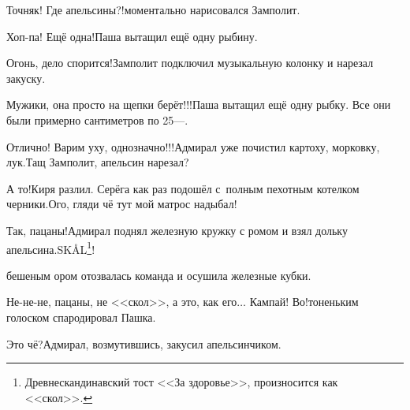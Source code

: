 \diagdash Точняк! Где апельсины?!\mdash моментально нарисовался Замполит.

\diagdash Хоп-па! Ещё одна!\mdash Паша вытащил ещё одну рыбину.

\diagdash Огонь, дело спорится!\mdash Замполит подключил музыкальную колонку и нарезал закуску.

\diagdash Мужики, она просто на щепки берёт!!!\mdash Паша вытащил ещё одну рыбку. Все они были примерно сантиметров по 25\thinspace\nobreakdash---.

\diagdash Отлично! Варим уху, однозначно!!!\mdash Адмирал уже почистил картоху, морковку, лук.\mdash Тащ Замполит, апельсин нарезал?

\diagdash А то!\mdash Киря разлил. Серёга как раз подошёл с~полным пехотным котелком черники.\mdash Ого, гляди чё тут мой матрос надыбал!

\renewcommand*{\thefootnote}{\fnsymbol{footnote}}
\setcounter{footnote}{0}
\diagdash Так, пацаны!\mdash Адмирал поднял железную кружку с ромом и взял дольку апельсина.\mdash SKÅL{\footnote{Древнескандинавский тост <<За здоровье>>, произносится как <<скол>>.}}!

\mdash бешеным ором отозвалась команда и осушила железные кубки.

\diagdash Не-не-не, пацаны, не <<скол>>, а это, как его$\ldots$ Кампай! Во!\mdash тоненьким голоском спародировал Пашка. 

\diagdash Это чё?\mdash Адмирал, возмутившись, закусил апельсинчиком.

%

%	
%	
%	


